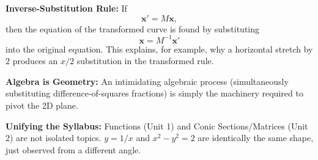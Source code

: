 \begin{takeaways}
\item \textbf{Inverse-Substitution Rule:} If
\[
\mathbf x'=M\mathbf x,
\]
then the equation of the transformed curve is found by substituting
\[
\mathbf x=M^{-1}\mathbf x'
\]
into the original equation. This explains, for example, why a horizontal stretch by $2$ produces an $x/2$ substitution in the transformed rule.
\item \textbf{Algebra is Geometry:} An intimidating algebraic process (simultaneously substituting difference-of-squares fractions) is simply the machinery required to pivot the 2D plane. 
\item \textbf{Unifying the Syllabus:} Functions (Unit 1) and Conic Sections/Matrices (Unit 2) are not isolated topics. $y = 1/x$ and $x^2 - y^2 = 2$ are identically the same shape, just observed from a different angle.
\end{takeaways}

